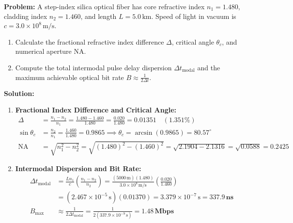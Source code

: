\begin{examplebox}
\textbf{Problem:} A step-index silica optical fiber has core refractive index $n_1 = 1.480$, cladding index $n_2 = 1.460$, and length $L = 5.0\,\text{km}$. Speed of light in vacuum is $c = 3.0 \times 10^8\,\text{m/s}$.
\begin{enumerate}[label=(\alph*)]
    \item Calculate the fractional refractive index difference $\Delta$, critical angle $\theta_c$, and numerical aperture $\text{NA}$.
    \item Compute the total intermodal pulse delay dispersion $\Delta t_{\text{modal}}$ and the maximum achievable optical bit rate $B \approx \frac{1}{2\Delta t}$.
\end{enumerate}

\textbf{Solution:}
\begin{enumerate}[label=(\alph*)]
    \item \textbf{Fractional Index Difference and Critical Angle:}
    \begin{align}
        \Delta &= \frac{n_1 - n_2}{n_1} = \frac{1.480 - 1.460}{1.480} = \frac{0.020}{1.480} = \mathbf{0.01351} \quad (1.351\%) \\
        \sin \theta_c &= \frac{n_2}{n_1} = \frac{1.460}{1.480} = 0.9865 \implies \theta_c = \arcsin(0.9865) = \mathbf{80.57^\circ} \\
        \text{NA} &= \sqrt{n_1^2 - n_2^2} = \sqrt{(1.480)^2 - (1.460)^2} = \sqrt{2.1904 - 2.1316} = \sqrt{0.0588} = \mathbf{0.2425}
    \end{align}
    \item \textbf{Intermodal Dispersion and Bit Rate:}
    \begin{align}
        \Delta t_{\text{modal}} &= \frac{L n_1}{c}\left(\frac{n_1 - n_2}{n_2}\right) = \frac{(5000\,\text{m})(1.480)}{3.0 \times 10^8\,\text{m/s}}\left(\frac{0.020}{1.460}\right) \\
        &= (2.467 \times 10^{-5}\,\text{s})(0.01370) = 3.379 \times 10^{-7}\,\text{s} = \mathbf{337.9\,\text{ns}} \\
        B_{\text{max}} &\approx \frac{1}{2 \Delta t_{\text{modal}}} = \frac{1}{2(337.9 \times 10^{-9}\,\text{s})} = \mathbf{1.48\,\text{Mbps}}
    \end{align}
\end{enumerate}
\end{examplebox}

